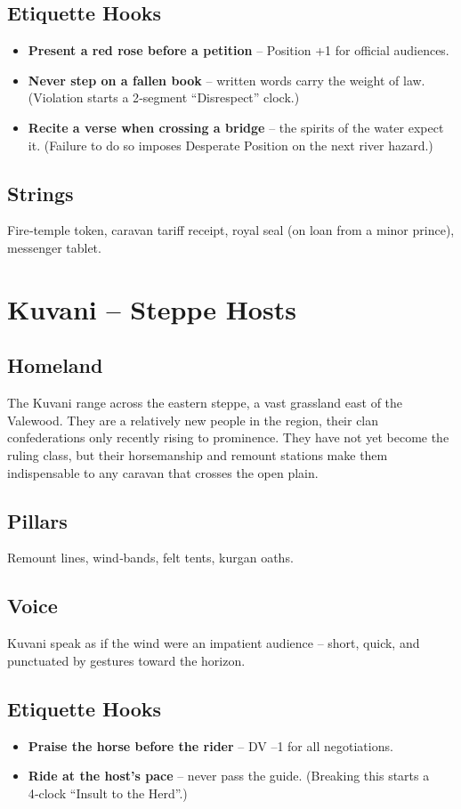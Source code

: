 \documentclass[11pt]{book}
\begin{document}
\subsection*{Etiquette Hooks}
\begin{itemize}
    \item \textbf{Present a red rose before a petition} -- Position +1 for official audiences.
    \item \textbf{Never step on a fallen book} -- written words carry the weight of law. (Violation starts a 2‑segment “Disrespect” clock.)
    \item \textbf{Recite a verse when crossing a bridge} -- the spirits of the water expect it. (Failure to do so imposes Desperate Position on the next river hazard.)
\end{itemize}

\subsection*{Strings}
Fire‑temple token, caravan tariff receipt, royal seal (on loan from a minor prince), messenger tablet.

\section{Kuvani -- Steppe Hosts}
\subsection*{Homeland}
The Kuvani range across the eastern steppe, a vast grassland east of the Valewood. They are a relatively new people in the region, their clan confederations only recently rising to prominence. They have not yet become the ruling class, but their horsemanship and remount stations make them indispensable to any caravan that crosses the open plain.

\subsection*{Pillars}
Remount lines, wind‑bands, felt tents, kurgan oaths.

\subsection*{Voice}
Kuvani speak as if the wind were an impatient audience -- short, quick, and punctuated by gestures toward the horizon.

\subsection*{Etiquette Hooks}
\begin{itemize}
    \item \textbf{Praise the horse before the rider} -- DV --1 for all negotiations.
    \item \textbf{Ride at the host’s pace} -- never pass the guide. (Breaking this starts a 4‑clock “Insult to the Herd”.)
\end{itemize}
\end{document}
